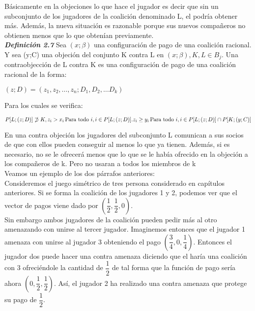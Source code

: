 \documentclass[10pt,a4paper]{book}
\begin{document}
Básicamente en la objeciones lo que hace el jugador es decir que sin un subconjunto de los jugadores de la coalición denominado L, el podría obtener más. Además, la nueva situación es razonable porque sus nuevos compañeros no obtienen menos que lo que obtenían previamente.\\


\textit{\textbf{Definición 2.7}} Sea $(x;\beta)$  una configuración de pago de una coalición racional. Y sea (y;C) una objeción del conjunto K contra L en $(x;\beta), K,L \in B_j$. Una contraobjección de L contra K es una configuración de pago de una coalición racional de la forma: \\
\begin{center}

$(z;D)=(z_1,z_2, \ldots ,z_n; D_1, D_2, \ldots D_k)$

\end{center}

Para los cuales se verifica:\\

\begin{center}

$P[L;(z;D)] \not\supset K, \newline
z_i > x_i \thinspace \mbox{Para todo } i,i \in P[L;(z;D)]. \newline
z_i \geq y_i \thinspace \mbox{Para todo } i,i \in P[L;(z;D)] \cap P[K;(y;C)]$

\end{center}



En una contra objeción los jugadores del subconjunto L comunican a sus socios de que con ellos pueden conseguir al menos lo que ya tienen. Además, si es necesario, no se le ofrecerá menos que lo que se le había ofrecido en la objeción a los compañeros de k. Pero no usaran a todos los miembros de k\\

Veamos un ejemplo de los dos párrafos anteriores:\\

Consideremos el juego simétrico de tres persona considerado en capítulos anteriores. Si se forma la coalición de los jugadores 1 y 2, podemos ver que el vector de pagos viene dado por $(\dfrac{1}{2},\dfrac{1}{2},0)$.\\
Sin embargo ambos jugadores de la coalición pueden pedir más al otro amenazando con unirse al tercer jugador. Imaginemos entonces que el jugador 1 amenaza con unirse al jugador 3 obteniendo el pago $(\dfrac{3}{4},0,\dfrac{1}{4})$. Entonces el jugador dos puede hacer una contra amenaza diciendo que el haría una coalición con 3 ofreciéndole la cantidad de $\dfrac{1}{2}$ de tal forma que la función de pago sería ahora $(0,\dfrac{1}{2},\dfrac{1}{2})$. Así, el jugador 2 ha realizado una contra amenaza que protege su pago de $\dfrac{1}{2}$.\\
\end{document}
